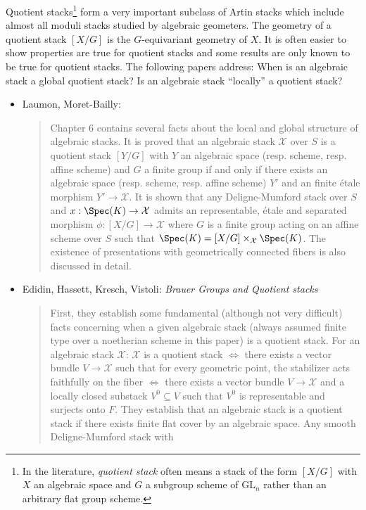 \noindent
Quotient stacks\footnote{In the literature,
\emph{quotient stack} often means a stack of the
form $[X/G]$ with $X$ an algebraic space and $G$ a subgroup scheme
of $\text{GL}_n$ rather than an arbitrary flat group scheme.}
form a very important subclass of Artin stacks which include almost all moduli
stacks studied by algebraic geometers. The geometry of a quotient stack
$[X/G]$ is the $G$-equivariant geometry of $X$. It is often easier to show
properties are true for quotient stacks and some results are only known to be
true for quotient stacks. The following papers address: When is an algebraic
stack a global quotient stack? Is an algebraic stack ``locally'' a quotient
stack?
\begin{itemize}
\item Laumon, Moret-Bailly: \cite[Chapter 6]{LM-B}
\begin{quote}
Chapter 6 contains several facts about the local and global structure of
algebraic stacks. It is proved that an algebraic stack $\mathcal{X}$ over $S$
is a
quotient stack $[Y/G]$ with $Y$ an algebraic space (resp. scheme, resp. affine
scheme) and $G$ a finite group if and only if there exists an algebraic space
(resp. scheme, resp. affine scheme) $Y'$ and an finite \'etale morphism $Y'
\to \mathcal{X}$. It is shown that any Deligne-Mumford stack over $S$ and
$x : \Spec(K) \to \mathcal{X}$ admits an representable, \'etale and
separated morphism $\phi : [X/G] \to \mathcal{X}$ where $G$ is a finite group
acting on an affine scheme over $S$ such
that $\Spec(K) = [X/G] \times_\mathcal{X} \Spec(K)$.
The existence of presentations
with geometrically connected fibers is also discussed in detail.
\end{quote}
\item
Edidin, Hassett, Kresch, Vistoli:
\emph{Brauer Groups and Quotient stacks} \cite{ehkv}
\begin{quote}
First, they establish some fundamental (although not very difficult)
facts concerning
when a given algebraic stack (always assumed finite type over a noetherian
scheme in this paper) is a quotient stack. For an algebraic stack
$\mathcal{X}$:
$\mathcal{X}$ is a quotient stack $\iff$ there exists a vector bundle $V \to
\mathcal{X}$ such
that for every geometric point, the stabilizer acts faithfully on the fiber
$\iff$ there exists a vector bundle $V \to \mathcal{X}$ and a locally closed
substack
$V^0 \subseteq V$ such that $V^0$ is representable and surjects onto $F$. They
establish that an algebraic stack is a quotient stack if there exists finite
flat cover by an algebraic space. Any smooth Deligne-Mumford stack with

\end{quote}
\end{itemize}
